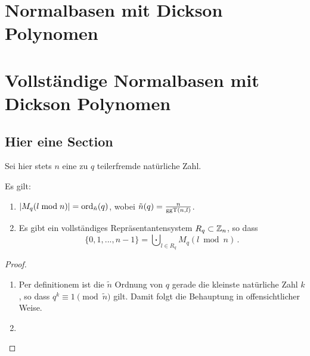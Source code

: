 \chapter{Normalbasen mit Dickson Polynomen}

\chapter{Vollständige Normalbasen mit Dickson Polynomen}

\section{Hier eine Section}

Sei hier stets $n$ eine zu $q$ teilerfremde natürliche Zahl.

\begin{lemma}
  Es gilt:
  \begin{enumerate}
    \item $| M_q(l\bmod n)| = \operatorname{ord}_{\tilde n}(q)$, 
      wobei $\tilde n(q) = \tfrac{n}{\operatorname{ggT}(n,l)}$.
    \item Es gibt ein vollständiges Repräsentantensystem $R_q \subset \mathbb{Z}_n$, so
      dass 
      \[ \{0,1,...,n-1\} = \bigcupdot_{l\in R_q} M_q(l \bmod n) \,.\]
  \end{enumerate}
\end{lemma}
\begin{proof}
  \begin{enumerate}
    \item Per definitionem ist die $\tilde n$ Ordnung von $q$ gerade die
      kleinste natürliche Zahl $k$, so dass $q^k \equiv 1 \pmod{\tilde n}$ gilt.
      Damit folgt die Behauptung in offensichtlicher Weise.
    \item 
  \end{enumerate}
\end{proof}

